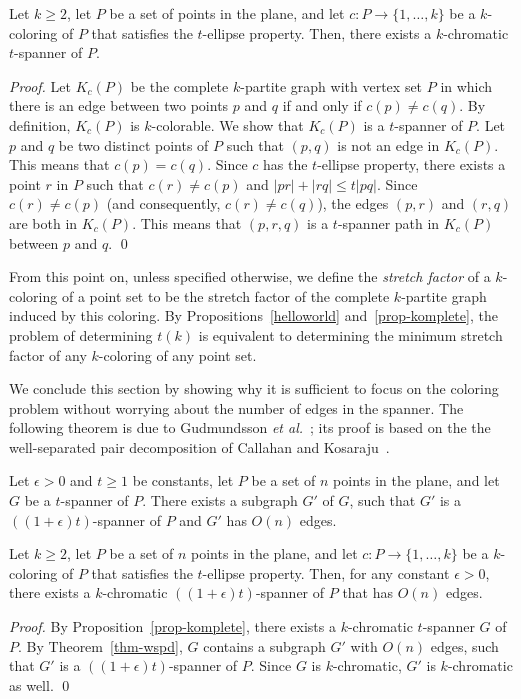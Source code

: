 \documentclass[pdftex,leqno,fleqn,12pts]{llncs}
\begin{document}
\begin{proposition}   \label{prop-komplete} 
Let $k \geq 2$, let $P$ be a set of points in the plane, and let 
$c:P\rightarrow\{1,\ldots ,k\}$ be a $k$-coloring of $P$ that
satisfies the $t$-ellipse property. Then, there exists a $k$-chromatic
$t$-spanner of $P$.
\end{proposition}
\begin{proof}
Let $K_c(P)$ be the complete $k$-partite graph with vertex set $P$ 
in which there is an edge between two points $p$ and $q$ if and only if
$c(p)\neq c(q)$. By definition, $K_c(P)$ is $k$-colorable. 
We show that $K_c(P)$ is a $t$-spanner of $P$. Let $p$ and $q$ be two 
distinct points of $P$ such that $(p,q)$ is not an edge in $K_c(P)$. 
This means that $c(p)=c(q)$. Since $c$ has the $t$-ellipse property, 
there exists a point $r$ in $P$ such that $c(r)\neq c(p)$ and 
$|pr|+|rq|\leq t|pq|$. Since $c(r)\neq c(p)$ (and consequently, 
$c(r)\neq c(q)$), the edges $(p,r)$ and $(r,q)$ are both in $K_c(P)$. 
This means that $(p,r,q)$ is a $t$-spanner path in $K_c(P)$ between 
$p$ and $q$. 
\qed
\end{proof}

From this point on, unless specified otherwise, we define the \emph{stretch factor} of a $k$-coloring of 
a point set to be the stretch factor of the complete $k$-partite graph 
induced by this coloring. By Propositions~\ref{helloworld}
and~\ref{prop-komplete}, the problem of determining $t(k)$ is 
equivalent to determining the minimum stretch factor of any 
$k$-coloring of any point set. 
 
We conclude this section by showing why it is sufficient to focus on 
the coloring problem without worrying about the number of edges in 
the spanner. The following theorem is due to 
Gudmundsson \emph{et al.}~\cite{glns-adogg-02}; its proof is based on 
the the well-separated pair decomposition of 
Callahan and Kosaraju~\cite{callahan95}. 

\begin{theorem}  \cite{glns-adogg-02}  \label{thm-wspd} 
Let $\epsilon>0$ and $t \geq 1$ be constants, let $P$ be a set of $n$ 
points in the plane, and let $G$ be a $t$-spanner of $P$. There exists 
a subgraph $G'$ of $G$, such that $G'$ is a $((1+\epsilon)t)$-spanner 
of $P$ and $G'$ has $O(n)$ edges.
\end{theorem}

\begin{proposition} 
\label{prop-gudm}
Let $k \geq 2$, let $P$ be a set of $n$ points in the plane, and let 
$c:P\rightarrow\{1,\ldots ,k\}$ be a $k$-coloring of $P$ that satisfies 
the $t$-ellipse property. Then, for any constant $\epsilon > 0$, there 
exists a $k$-chromatic $((1+\epsilon)t)$-spanner of $P$ that has 
$O(n)$ edges. 
\end{proposition}
\begin{proof} 
By Proposition~\ref{prop-komplete}, there exists a $k$-chromatic 
$t$-spanner $G$ of $P$. By Theorem~\ref{thm-wspd}, $G$ contains a 
subgraph $G'$ with $O(n)$ edges, such that $G'$ is a 
$((1+\epsilon)t)$-spanner of $P$. Since $G$ is $k$-chromatic, 
$G'$ is $k$-chromatic as well. 
\qed  
\end{proof}
\end{document}
